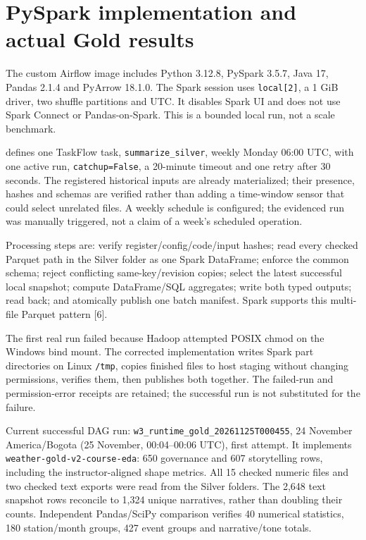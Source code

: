 \documentclass[10pt]{article}
\begin{document}
\section{PySpark implementation and actual Gold results}
The custom Airflow image includes Python 3.12.8, PySpark 3.5.7, Java 17,
Pandas 2.1.4 and PyArrow 18.1.0. The Spark session uses \texttt{local[2]}, a 1 GiB
driver, two shuffle partitions and UTC. It disables Spark UI and does not use
Spark Connect or Pandas-on-Spark. This is a bounded local run, not a scale benchmark.

 defines one TaskFlow task,
\texttt{summarize\_silver}, weekly Monday 06:00 UTC, with one active run,
\texttt{catchup=False}, a 20-minute timeout and one retry after 30 seconds.
The registered historical inputs are already materialized; their presence,
hashes and schemas are verified rather than adding a time-window sensor that
could select unrelated files. A weekly schedule is configured; the evidenced
run was manually triggered, not a claim of a week's scheduled operation.

Processing steps are: verify register/config/code/input hashes; read every checked
Parquet path in the Silver folder as one Spark DataFrame; enforce the common schema; reject conflicting
same-key/revision copies; select the latest successful local snapshot; compute
DataFrame/SQL aggregates; write both typed outputs; read back; and atomically
publish one batch manifest. Spark supports this multi-file Parquet pattern [6].

The first real run failed because Hadoop attempted POSIX chmod on the Windows
bind mount. The corrected implementation writes Spark part directories on Linux
\texttt{/tmp}, copies finished files to host staging without changing permissions,
verifies them, then publishes both together. The failed-run and permission-error
receipts are retained; the successful run is not substituted for the failure.

Current successful DAG run: \texttt{w3\_runtime\_gold\_20261125T000455},
24 November America/Bogota (25 November, 00:04--00:06 UTC), first attempt.
It implements \texttt{weather-gold-v2-course-eda}: 650 governance and 607
storytelling rows, including the instructor-aligned shape metrics. All 15 checked
numeric files and two checked text exports were read from the Silver folders.
The 2,648 text snapshot rows reconcile to 1,324 unique narratives, rather than
doubling their counts. Independent Pandas/SciPy comparison verifies 40 numerical
statistics, 180 station/month groups, 427 event groups and narrative/tone totals.
\end{document}
